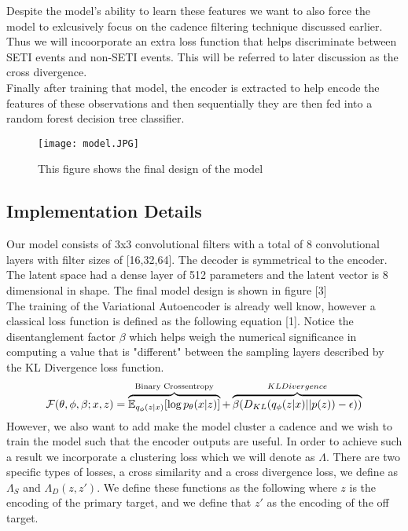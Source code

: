 \documentclass{article}
\begin{document}
Despite the model's ability to learn these features we want to also force the model to exlcusively focus on the cadence filtering technique discussed earlier. Thus we will incoorporate an extra loss function that helps discriminate between SETI events and non-SETI events. This will be referred to later discussion as the cross divergence. \\

Finally after training that model, the encoder is extracted to help encode the features of these observations and then sequentially they are then fed into a random forest decision tree classifier. \\
\begin{figure}[h]
\texttt{[image: model.JPG]}
\centering
\caption{This figure shows the final design of the model }
\end{figure}
\subsection{Implementation Details}

Our model consists of 3x3 convolutional filters with a total of 8 convolutional layers with filter sizes of [16,32,64]. The decoder is symmetrical to the encoder. The latent space had a dense layer of 512 parameters and the latent vector is 8 dimensional in shape. The final model design is shown in figure [3] \\

The training of the Variational Autoencoder is already well know, however a classical loss function is defined as the following equation [1]. Notice the disentanglement factor $\beta$ which helps weigh the numerical significance in computing a value that is "different" between the sampling layers described by the KL Divergence loss function. 
\begin{equation}

\mathcal{F}(\theta,\phi,\beta; x,z) = \overbrace{\mathbb{E}_{q_\phi(z|x)}[\log p_\theta(x|z)]}^{\text{Binary Crossentropy}} + 
\overbrace{\beta (D_{KL}(q_\phi(z|x)||p(z))-\epsilon))}^{KL Divergence}
\centering

\end{equation}
However, we also want to add make the model cluster a cadence and we wish to train the model such that the encoder outputs are useful. In order to achieve such a result we incorporate a clustering loss which we will denote as $\Lambda$. There are two specific types of losses, a cross similarity and a cross divergence loss, we define as $\Lambda_S$ and $\Lambda_D(z,z')$. We define these functions as the following where $z$ is the encoding of the primary target, and we define that $z'$ as the encoding of the off target.
\end{document}
